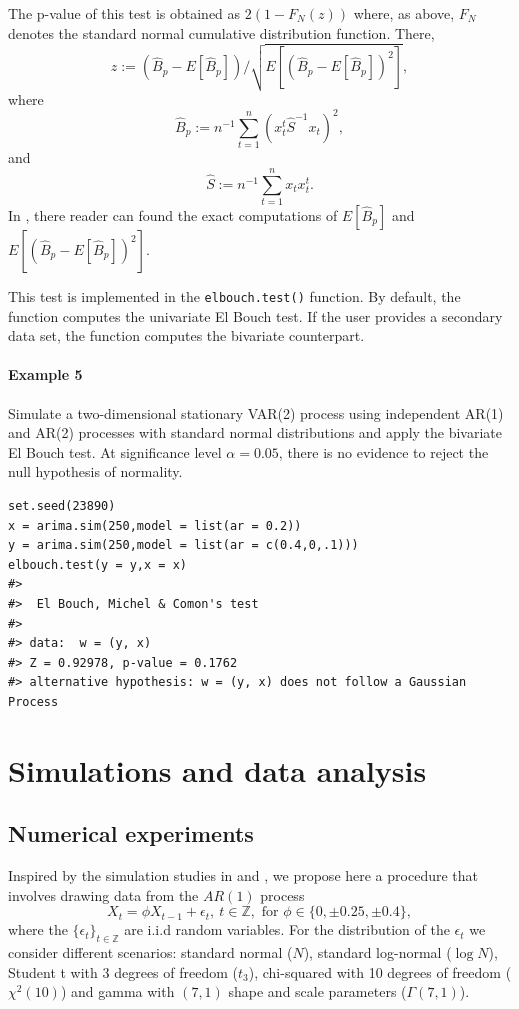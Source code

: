 The p-value of this test is obtained as \(2(1-F_N(z))\) where, as above, \(F_N\) denotes the standard normal cumulative distribution function. There,
\[
  z:=(\hat{B}_p-E[\hat{B}_p])/\sqrt{E[(\hat{B}_p-E[\hat{B}_p])^2]},
 \]
where
\[
  \hat{B}_p:=n^{-1}\sum_{t=1}^n(x_t^t \hat{S}^{-1}x_t)^2,
 \]
and
\[
 \hat{S}:=n^{-1}\sum_{t=1}^n x_t x_t^t.
\]
In \citet{el2022normality}, there reader can found the exact computations of \(E[\hat{B}_p]\) and \(E[(\hat{B}_p-E[\hat{B}_p])^2].\)

This test is implemented in the \texttt{elbouch.test()} function. By default, the function computes the univariate El Bouch test. If the user provides a secondary data set, the function computes the bivariate counterpart.

\paragraph{Example 5}\label{example-5}

Simulate a two-dimensional stationary VAR(2) process using independent AR(1) and AR(2) processes with standard normal distributions and apply the bivariate El Bouch test. At significance level \(\alpha = 0.05\), there is no evidence to reject the null hypothesis of normality.

\begin{verbatim}
set.seed(23890)
x = arima.sim(250,model = list(ar = 0.2))
y = arima.sim(250,model = list(ar = c(0.4,0,.1)))
elbouch.test(y = y,x = x)
#> 
#>  El Bouch, Michel & Comon's test
#> 
#> data:  w = (y, x)
#> Z = 0.92978, p-value = 0.1762
#> alternative hypothesis: w = (y, x) does not follow a Gaussian Process
\end{verbatim}

\section{Simulations and data analysis}\label{simulations-and-data-analysis}

\subsection{Numerical experiments}\label{numerical-experiments}

Inspired by the simulation studies in \citet{vavra2017} and \citet{nietoreyes2014}, we propose here a procedure that involves drawing data from the \(AR(1)\) process
\begin{equation}
 X_t = \phi X_{t-1} + \epsilon_t, \ t \in\mathbb{Z}, \text{ for } \phi \in \{ 0,\pm 0.25,\pm 0.4\}, \label{eq:eqAR}
\end{equation}
where the \(\{\epsilon_t\}_{t\in\mathbb{Z}}\) are i.i.d random variables. For the distribution of the \(\epsilon_t\) we consider different scenarios: standard normal (\(N\)), standard log-normal (\(\log N\)), Student t with 3 degrees of freedom (\(t_3\)), chi-squared with 10 degrees of freedom (\(\chi^2(10)\)) and gamma with \((7, 1)\) shape and scale parameters (\(\Gamma(7,1)\)).

